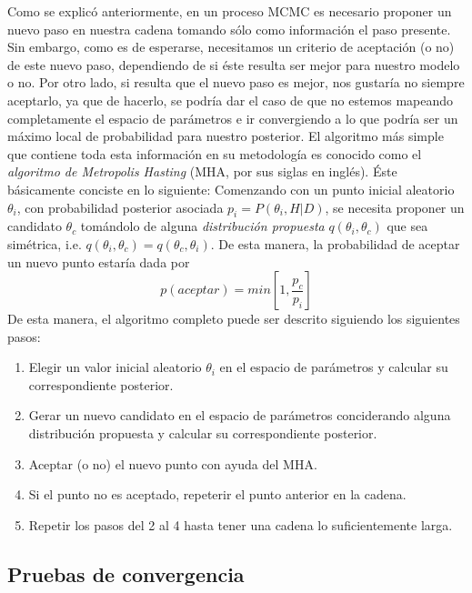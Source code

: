 \documentclass[onecolumn,           %
               showpacs,            %
               preprintnumbers,     %
               aps,                 %
               prl,          	    %
               letterpaper,             %
               superscriptaddress,      %
               nofootinbib,         %
               tightenlines,        %
               floats,floatfix      %
               ,usenatbib,
               ]{revtex4-1}
\begin{document}
Como se explic\'o anteriormente, en un proceso MCMC es necesario proponer un nuevo paso en nuestra cadena tomando s\'olo como informaci\'on el paso presente. Sin embargo, como es de esperarse, necesitamos un criterio de aceptaci\'on (o no) de este nuevo paso, dependiendo de si \'este resulta ser mejor para nuestro modelo o no. Por otro lado, si resulta que el nuevo paso es mejor, nos gustar\'ia no siempre aceptarlo, ya que de hacerlo, se podr\'ia dar el caso de que no estemos mapeando completamente el espacio de par\'ametros e ir convergiendo a lo que podr\'ia ser un m\'aximo local de probabilidad para nuestro posterior. El algoritmo m\'as simple que contiene toda esta informaci\'on en su metodolog\'ia es conocido como el \textit{algoritmo de Metropolis Hasting} (MHA, por sus siglas en ingl\'es). \'Este b\'asicamente conciste en lo siguiente: Comenzando con un punto inicial aleatorio $\theta_i$, con probabilidad posterior asociada $p_i = P(\theta_i,H|D)$, se necesita proponer un candidato $\theta_c$ tom\'andolo de alguna \textit{distribuci\'on propuesta} $q(\theta_i,\theta_c)$ que sea sim\'etrica, i.e. $q(\theta_i,\theta_c)=q(\theta_c,\theta_i)$. De esta manera, la probabilidad de aceptar un nuevo punto estar\'ia dada por 
\begin{equation}
p(aceptar)=min\left[1,\frac{p_c}{p_i}\right]
\end{equation}
De esta manera, el algoritmo completo puede ser descrito siguiendo los siguientes pasos:
\begin{enumerate}
\item Elegir un valor inicial aleatorio $\theta_i$ en el espacio de par\'ametros y calcular su correspondiente posterior.
\item Gerar un nuevo candidato en el espacio de par\'ametros conciderando alguna distribuci\'on propuesta y calcular su correspondiente posterior.
\item Aceptar (o no) el nuevo punto con ayuda del MHA.
\item Si el punto no es aceptado, repeterir el punto anterior en la cadena.
\item Repetir los pasos del 2 al 4 hasta tener una cadena lo suficientemente larga.
\end{enumerate}
\subsection{Pruebas de convergencia}
\end{document}
